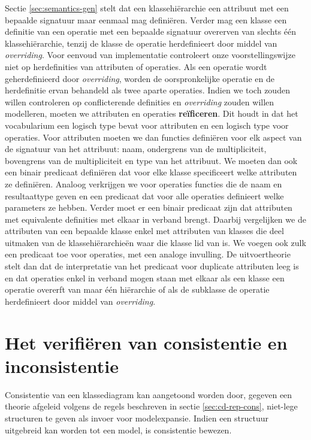 Sectie \ref{sec:semantics-gen} stelt dat een klassehi\"erarchie een attribuut met een bepaalde signatuur maar eenmaal mag defini\"eren. Verder mag een klasse een definitie van een operatie met een bepaalde signatuur overerven van slechts \'e\'en klassehi\"erarchie, tenzij de klasse de operatie herdefinieert door middel van \textit{overriding}. Voor eenvoud van implementatie controleert onze voorstellingswijze niet op herdefinities van attributen of operaties. Als een operatie wordt geherdefinieerd door \textit{overriding}, worden de oorspronkelijke operatie en de herdefinitie ervan behandeld als twee aparte operaties. Indien we toch zouden willen controleren op conflicterende definities en \textit{overriding} zouden willen modelleren, moeten we attributen en operaties \textbf{re\"ificeren}. Dit houdt in dat het vocabularium een logisch type bevat voor attributen en een logisch type voor operaties. Voor attributen moeten we dan functies defini\"eren voor elk aspect van de signatuur van het attribuut: naam, ondergrens van de multipliciteit, bovengrens van de multipliciteit en type van het attribuut. We moeten dan ook een binair predicaat defini\"eren dat voor elke klasse specificeert welke attributen ze defini\"eren. Analoog verkrijgen we voor operaties functies die de naam en resultaattype geven en een predicaat dat voor alle operaties definieert welke parameters ze hebben. Verder moet er een binair predicaat zijn dat attributen met equivalente definities met elkaar in verband brengt. Daarbij vergelijken we de attributen van een bepaalde klasse enkel met attributen van klasses die deel uitmaken van de klassehi\"erarchie\"en waar die klasse lid van is. We voegen ook zulk een predicaat toe voor operaties, met een analoge invulling. De uitvoertheorie stelt dan dat de interpretatie van het predicaat voor duplicate attributen leeg is en dat operaties enkel in verband mogen staan met elkaar als een klasse een operatie overerft van maar \'e\'en hi\"erarchie of als de subklasse de operatie herdefinieert door middel van \textit{overriding}.

\section{Het verifi\"eren van consistentie en inconsistentie}\label{sec:cons-verify}

Consistentie van een klassediagram kan aangetoond worden door, gegeven een theorie afgeleid volgens de regels beschreven in sectie \ref{sec:cd-rep-cons}, niet-lege structuren te geven als invoer voor modelexpansie. Indien een structuur uitgebreid kan worden tot een model, is consistentie bewezen.


